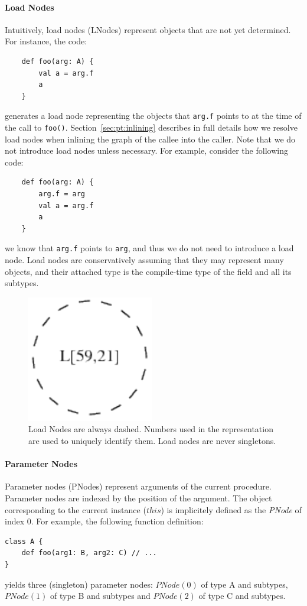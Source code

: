 \paragraph{Load Nodes}
Intuitively, load nodes (LNodes) represent objects that are not yet determined.
For instance, the code:
\begin{lstlisting}
    def foo(arg: A) {
        val a = arg.f
        a
    }
\end{lstlisting}
generates a load node representing the objects that \verb/arg.f/ points to
at the time of the call to \verb/foo()/. Section~\ref{sec:pt:inlining}
describes in full details how we resolve load nodes when inlining the graph of
the callee into the caller. Note that we do not introduce load nodes unless
necessary. For example, consider the following code:
\begin{lstlisting}
    def foo(arg: A) {
        arg.f = arg
        val a = arg.f
        a
    }
\end{lstlisting}
we know that \verb/arg.f/ points to \verb/arg/, and thus we do not need to
introduce a load node. Load nodes are conservatively assuming that they may
represent many objects, and their attached type is the compile-time type of the
field and all its subtypes.

\begin{figure}[h]
    \centering

    \includegraphics{images/pt_lnodes}

    \caption{Load Nodes are always dashed. Numbers used in the representation
    are used to uniquely identify them. Load nodes are never singletons.}
    \label{fig:pt:lnodes}
\end{figure}

\paragraph{Parameter Nodes} Parameter nodes (PNodes) represent arguments of the current
procedure. Parameter nodes are indexed by the position of the argument. The object
corresponding to the current instance ($this$) is implicitely defined as the
\emph{PNode} of index 0. For example, the following function definition:
\begin{lstlisting}
class A {
    def foo(arg1: B, arg2: C) // ...
}
\end{lstlisting}
yields three (singleton) parameter nodes: $PNode(0)$ of type A and
subtypes, $PNode(1)$ of type B and subtypes and $PNode(2)$ of type C and
subtypes.

